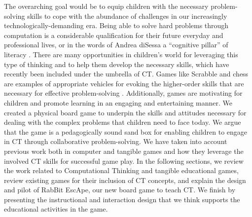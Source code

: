 \documentclass{acm_proc_article-sp}
\begin{document}
The overarching goal would be to equip children with the necessary problem-solving skills to cope with the abundance of challenges in our increasingly technologically-demanding era. 
Being able to solve hard problems through computation is a considerable qualification for their future everyday and professional lives, or in the words of Andrea diSessa a ``cognitive pillar'' of literacy \cite{disessa2001changing}. 
There are many opportunities in children’s world for leveraging this type of thinking and to help them develop the necessary skills, which have recently been included under the umbrella of CT. 
Games like Scrabble and chess are examples of appropriate vehicles for evoking the higher-order skills that are necessary for effective problem-solving \cite{newell1972human}. 
Additionally, games are motivating for children and promote learning in an engaging and entertaining manner.
We created a physical board game to underpin the skills and attitudes necessary for dealing with the complex problems that children need to face today. 
We argue that the game is a pedagogically sound sand box for enabling children to engage in CT through collaborative problem-solving. 
We have taken into account previous work both in computer and tangible games and how they leverage the involved CT skills for successful game play. 
In the following sections, we review the work related to Computational Thinking and tangible educational games, review existing games for their inclusion of CT concepts, and explain the design and pilot of RabBit EscApe, our new board game to teach CT. We finish by presenting the instructional and interaction design that we think supports the educational activities in the game.







\end{document}

